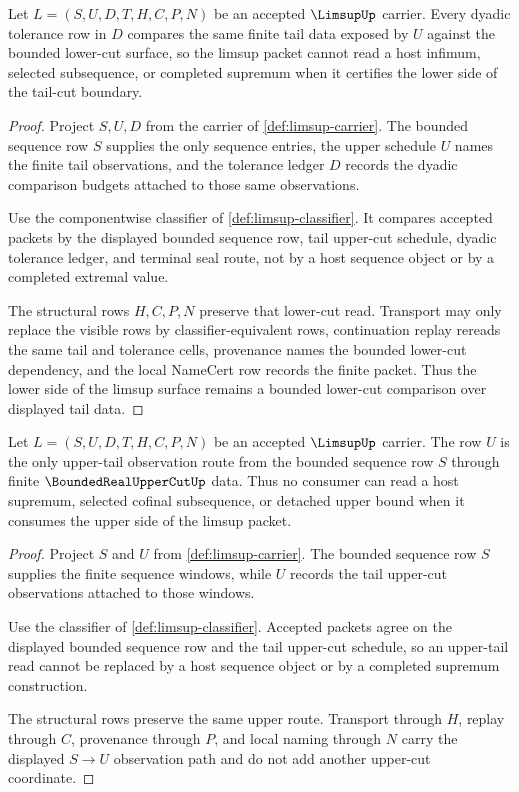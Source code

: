 \begin{theorem}
\label{thm:limsup-tail-lower-cut-compatibility}
Let $L=(S,U,D,T,H,C,P,N)$ be an accepted $\LimsupUp$ carrier. Every dyadic tolerance row in $D$ compares the same finite tail data exposed by $U$ against the bounded lower-cut surface, so the limsup packet cannot read a host infimum, selected subsequence, or completed supremum when it certifies the lower side of the tail-cut boundary.
\end{theorem}
\begin{proof}
Project $S,U,D$ from the carrier of \autoref{def:limsup-carrier}. The bounded sequence row $S$ supplies the only sequence entries, the upper schedule $U$ names the finite tail observations, and the tolerance ledger $D$ records the dyadic comparison budgets attached to those same observations.

Use the componentwise classifier of \autoref{def:limsup-classifier}. It compares accepted packets by the displayed bounded sequence row, tail upper-cut schedule, dyadic tolerance ledger, and terminal seal route, not by a host sequence object or by a completed extremal value.

The structural rows $H,C,P,N$ preserve that lower-cut read. Transport may only replace the visible rows by classifier-equivalent rows, continuation replay rereads the same tail and tolerance cells, provenance names the bounded lower-cut dependency, and the local NameCert row records the finite packet. Thus the lower side of the limsup surface remains a bounded lower-cut comparison over displayed tail data.
\end{proof}

\begin{theorem}
\label{thm:limsup-tail-upper-cut-exactness}
Let $L=(S,U,D,T,H,C,P,N)$ be an accepted $\LimsupUp$ carrier. The row $U$ is the only upper-tail observation route from the bounded sequence row $S$ through finite $\BoundedRealUpperCutUp$ data. Thus no consumer can read a host supremum, selected cofinal subsequence, or detached upper bound when it consumes the upper side of the limsup packet.
\end{theorem}
\begin{proof}
Project $S$ and $U$ from \autoref{def:limsup-carrier}. The bounded sequence row $S$ supplies the finite sequence windows, while $U$ records the tail upper-cut observations attached to those windows.

Use the classifier of \autoref{def:limsup-classifier}. Accepted packets agree on the displayed bounded sequence row and the tail upper-cut schedule, so an upper-tail read cannot be replaced by a host sequence object or by a completed supremum construction.

The structural rows preserve the same upper route. Transport through $H$, replay through $C$, provenance through $P$, and local naming through $N$ carry the displayed $S \to U$ observation path and do not add another upper-cut coordinate.
\end{proof}

